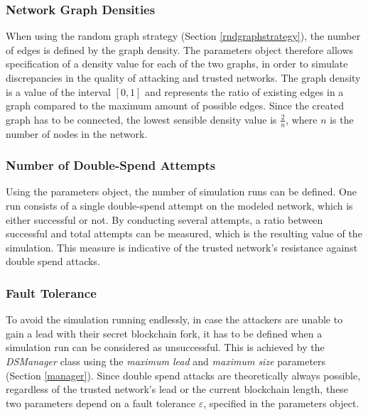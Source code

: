 \documentclass[a4paper,12pt,twoside]{report}
\begin{document}
\subsubsection{Network Graph Densities}
When using the random graph strategy (Section \ref{rndgraphstrategy}), the number of edges is defined by the graph density. The parameters object therefore allows specification of a density value for each of the two graphs, in order to simulate 
discrepancies in the quality of attacking and trusted networks. The graph density is a value of the interval $[0,1]$ and represents the ratio of existing edges in a graph compared to the maximum amount of possible edges. Since the created graph has to be connected, the lowest sensible density value is $\frac{2}{n}$, where $n$ is the number of nodes in the network.
\subsubsection{Number of Double-Spend Attempts}
Using the parameters object, the number of simulation runs can be defined. One run consists of a single double-spend attempt on the modeled network, which is either successful or not. By conducting several attempts, a ratio between successful and total attempts can be measured, which is the resulting value of the simulation. This measure is indicative of the trusted network's resistance against double spend attacks.
\subsubsection{Fault Tolerance}\label{faulttolerance}
To avoid the simulation running endlessly, in case the attackers are unable to gain a lead with their secret blockchain fork, it has to be defined when a simulation run can be considered as unsuccessful. This is achieved by the \textit{DSManager} class using the \textit{maximum lead} and \textit{maximum size} parameters (Section \ref{manager}). Since double spend attacks are theoretically always possible, regardless of the trusted network's lead or the current blockchain length, these two parameters depend on a fault tolerance $\varepsilon$, specified in the parameters object.
\end{document}
